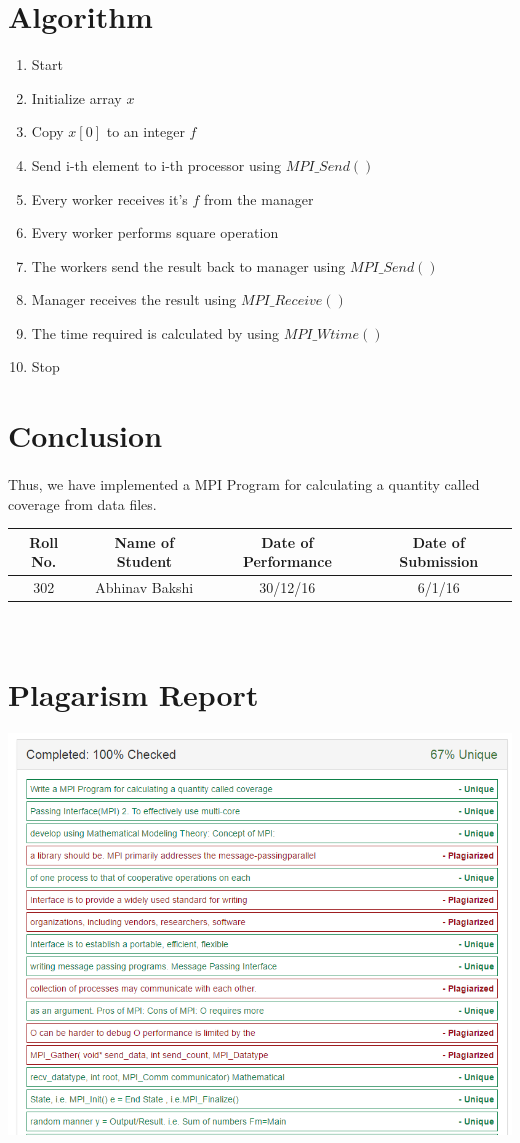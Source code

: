 \documentclass[a4paper,12pt]{article}
\begin{document}
\section{Algorithm}
\begin{enumerate}
	\item Start
    \item Initialize array $x$
    \item Copy $x[0]$ to an integer $f$
    \item Send i-th element to i-th processor using $MPI\_Send()$
    \item Every worker receives it's $f$ from the manager
    \item Every worker performs square operation
    \item The workers send the result back to manager using $MPI\_Send()$
    \item Manager receives the result using $MPI\_Receive()$
    \item The time required is calculated by using $MPI\_Wtime()$
    \item Stop
\end{enumerate}

\section{Conclusion}
	\paragraph{} Thus, we have implemented a MPI Program for calculating a quantity called coverage from data files. 
\vspace{20px}
\begin{center}
	\begin{tabular}
		{|c|c|c|c|}\hline
		{\bf Roll No.}		&{\bf Name of Student}		&{\bf Date of Performance}  				&{\bf Date of Submission}  \\ \hline
		{302}	&	{Abhinav Bakshi}& {30/12/16}		& { 6/1/16}\\ \hline
	\end{tabular}\\ 
\end{center}

\section{Plagarism Report}
\includegraphics[scale=0.75]{mpi_plagarism}
\end{document}
